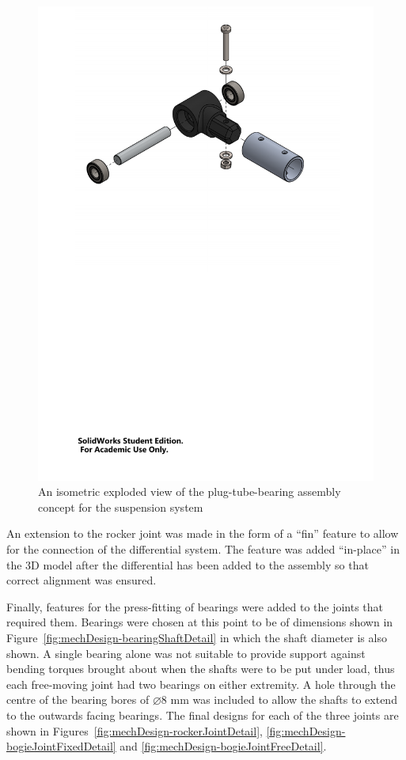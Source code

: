         \begin{figure}[H]
          \centering
          \includegraphics[clip, trim=2cm 17cm 2cm 1cm, width=0.8\linewidth]{figures/plug-tube-bearing}
          \caption[An isometric exploded view of the plug-tube-bearing assembly concept for the suspension system]{An isometric exploded view of the plug-tube-bearing assembly concept for the suspension system}
          \label{fig:mechDesign-plugTubeBearingDetail}
        \end{figure}        
        
        An extension to the rocker joint was made in the form of a ``fin'' feature to allow for the connection of the differential system. The feature was added ``in-place'' in the 3D model after the differential has been added to the assembly so that correct alignment was ensured.
        
        Finally, features for the press-fitting of bearings were added to the joints that required them. Bearings were chosen at this point to be of dimensions shown in Figure~\ref{fig:mechDesign-bearingShaftDetail} in which the shaft diameter is also shown. A single bearing alone was not suitable to provide support against bending torques brought about when the shafts were to be put under load, thus each free-moving joint had two bearings on either extremity. A hole through the centre of the bearing bores of $\diameter8$ mm was included to allow the shafts to extend to the outwards facing bearings. The final designs for each of the three joints are shown in Figures~\ref{fig:mechDesign-rockerJointDetail}, \ref{fig:mechDesign-bogieJointFixedDetail} and \ref{fig:mechDesign-bogieJointFreeDetail}.
        
